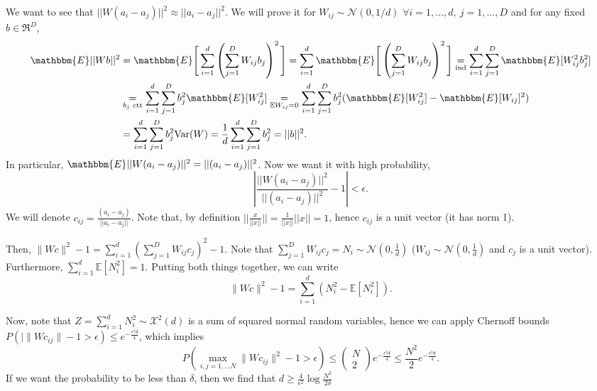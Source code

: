 \documentclass[11pt, english]{article}
\newcommand{\su}[2]{\sum\limits_{#1}^{#2}}
\begin{document}
We want to see that $||W(a_i-a_j)||^2\approx ||a_i-a_j||^2$. We will prove it for $W_{ij} \sim \mathcal{N}(0, 1/d)$ $\forall i=1,\dots,d,\ j=1,\dots,D$ and for any fixed $b\in \Re^D$, 
\begin{align}
	\mathbbm{E}||Wb||^2&= \mathbbm{E}\Bigg[\sum\limits_{i=1}^d\left(\sum\limits_{j=1}^D W_{ij}b_j\right)^2\Bigg]=\sum\limits_{i=1}^d\mathbbm{E}\Bigg[\left(\sum\limits_{j=1}^DW_{ij}b_j\right)^2\Bigg] \underset{\text{ind}}{=}\sum\limits_{i=1}^d\sum\limits_{j=1}^D\mathbbm{E}[W_{ij}^2b_j^2]\\
	& \underset{b_j\text{ ctt}}{=}\sum\limits_{i=1}^d\sum\limits_{j=1}^Db_j^2\mathbbm{E}[W_{ij}^2]\underset{\mathbb{E}W_{ij}=0}{=}\sum\limits_{i=1}^d\sum\limits_{j=1}^Db_j^2(\mathbbm{E}[W_{ij}^2] - \mathbbm{E}[W_{ij}]^2)\\
	&=\sum\limits_{i=1}^d\sum\limits_{j=1}^Db_j^2\text{Var}(W)=\frac{1}{d} \sum_{i=1}^d\sum\limits_{j=1}^Db_j^2=||b||^2.
\end{align}
In particular, $\mathbbm{E}||W(a_i-a_j)||^2=||(a_i-a_j)||^2$. Now we want it with high probability,
\begin{equation}
	\left\lvert\frac{||W(a_i-a_j)||^2}{||(a_i-a_j)||^2}-1\right\lvert<\epsilon.
\end{equation}
We will denote $c_{ij}=\frac{(a_i-a_j)}{||a_i-a_j||}$. Note that, by definition $||\frac{x}{||x||}|| = \frac{1}{||x||}||x|| = 1$, hence $c_{ij}$ is a unit vector (it has norm 1).
	
Then, $\| W c\|^2-1=\su{i=1}{d}\left(\su{j=1}{D}W_{ij}c_j\right)^2-1$. Note that $\su{j=1}{D}W_{ij}c_j = N_i \sim \mathcal{N}(0,\frac{1}{d})$ ($W_{ij}\sim \mathcal{N}(0,\frac{1}{d})$ and $c_{j}$ is a unit vector). Furthermore, $\su{i=1}{d}\mathbb{E}[N_i^2]=1$. Putting both things together, we can write 
\begin{equation}
	\|Wc\|^2-1=\sum\limits_{i=1}^d\left(N_i^2-\mathbb{E}[N_i^2]\right).
\end{equation} 

Now, note that $Z = \sum_{i=1}^{d}N_i^2 \sim \mathcal{X}^2(d)$ is a sum of squared normal random variables, hence we can apply Chernoff bounds
$P(|\|Wc_{ij}\|-1>\epsilon)\leq e^{-\frac{\epsilon^2d}{4}}$, which implies
\begin{equation}
	P\left(\underset{i,j=1,\dots N}{\max}\|Wc_{ij}\|^2-1>\epsilon\right)\leq \left(\begin{array}{c}
	N\\
	2
	\end{array}\right)e^{-\frac{\epsilon^2d}{4}}\leq \frac{N^2}{2}e^{-\frac{\epsilon^2d}{4}}.
\end{equation}
If we want the probability to be less than $\delta$, then we find that $d\geq \frac{4}{\epsilon^2}\log\frac{N^2}{2\delta}$\\
 
\end{document}
